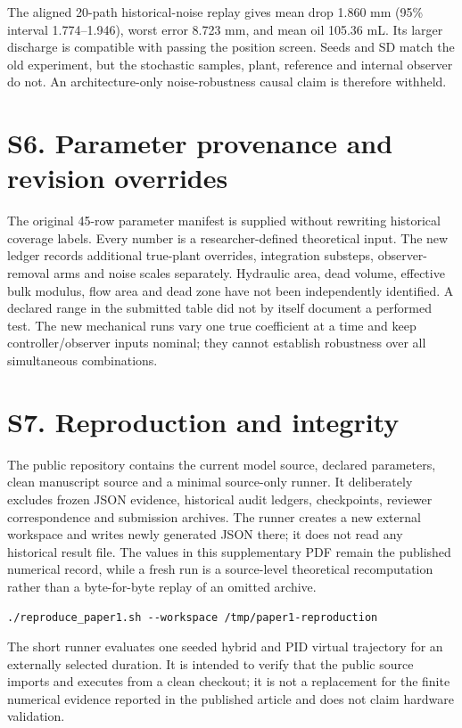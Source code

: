 \documentclass[11pt,a4paper]{article}
\begin{document}
The aligned 20-path historical-noise replay gives mean drop 1.860 mm (95\% interval 1.774--1.946), worst error 8.723 mm, and mean oil 105.36 mL. Its larger discharge is compatible with passing the position screen. Seeds and SD match the old experiment, but the stochastic samples, plant, reference and internal observer do not. An architecture-only noise-robustness causal claim is therefore withheld.
\section*{S6. Parameter provenance and revision overrides}
The original 45-row parameter manifest is supplied without rewriting historical coverage labels. Every number is a researcher-defined theoretical input. The new ledger records additional true-plant overrides, integration substeps, observer-removal arms and noise scales separately. Hydraulic area, dead volume, effective bulk modulus, flow area and dead zone have not been independently identified. A declared range in the submitted table did not by itself document a performed test. The new mechanical runs vary one true coefficient at a time and keep controller/observer inputs nominal; they cannot establish robustness over all simultaneous combinations.

\section*{S7. Reproduction and integrity}
The public repository contains the current model source, declared parameters, clean manuscript source and a minimal source-only runner. It deliberately excludes frozen JSON evidence, historical audit ledgers, checkpoints, reviewer correspondence and submission archives. The runner creates a new external workspace and writes newly generated JSON there; it does not read any historical result file. The values in this supplementary PDF remain the published numerical record, while a fresh run is a source-level theoretical recomputation rather than a byte-for-byte replay of an omitted archive.
\begin{verbatim}
./reproduce_paper1.sh --workspace /tmp/paper1-reproduction
\end{verbatim}
The short runner evaluates one seeded hybrid and PID virtual trajectory for an externally selected duration. It is intended to verify that the public source imports and executes from a clean checkout; it is not a replacement for the finite numerical evidence reported in the published article and does not claim hardware validation.
\end{document}
